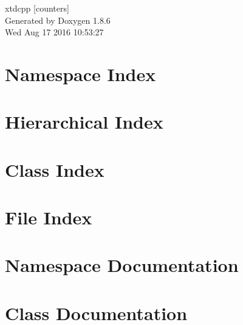 \documentclass[twoside]{book}
\newcommand{\clearemptydoublepage}{%
  \newpage{\pagestyle{empty}\cleardoublepage}%
}
\begin{document}
\hypersetup{pageanchor=false}
\begin{titlepage}
\vspace*{7cm}
\begin{center}%
{\Large xtdcpp \mbox{[}counters\mbox{]} }\\
\vspace*{1cm}
{\large Generated by Doxygen 1.8.6}\\
\vspace*{0.5cm}
{\small Wed Aug 17 2016 10:53:27}\\
\end{center}
\end{titlepage}
\clearemptydoublepage
\tableofcontents
\clearemptydoublepage
{}
\hypersetup{pageanchor=true}

\chapter{Namespace Index}

\chapter{Hierarchical Index}

\chapter{Class Index}

\chapter{File Index}

\chapter{Namespace Documentation}


\chapter{Class Documentation}

















\end{document}
